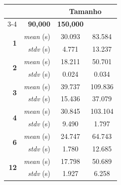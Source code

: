 \begin{tabular}{rr|cc}
\toprule
\multicolumn{2}{r|}{} & \multicolumn{2}{c}{\textbf{Tamanho}} \\
\cmidrule(lr){3-4}
\multicolumn{2}{c|}{\textbf{Threads}} & \textbf{90,000} & \textbf{150,000} \\
\midrule
\multirow{2}{*}{\textbf{1}}
& \textit{mean} (s) & 30.093 & 83.584 \\
& \textit{stdv} (s) & 4.771 & 13.237 \\
\midrule
\multirow{2}{*}{\textbf{2}}
& \textit{mean} (s) & 18.211 & 50.701 \\
& \textit{stdv} (s) & 0.024 & 0.034 \\
\midrule
\multirow{2}{*}{\textbf{3}}
& \textit{mean} (s) & 39.737 & 109.836 \\
& \textit{stdv} (s) & 15.436 & 37.079 \\
\midrule
\multirow{2}{*}{\textbf{4}}
& \textit{mean} (s) & 30.845 & 103.104 \\
& \textit{stdv} (s) & 9.490 & 1.797 \\
\midrule
\multirow{2}{*}{\textbf{6}}
& \textit{mean} (s) & 24.747 & 64.743 \\
& \textit{stdv} (s) & 1.780 & 12.685 \\
\midrule
\multirow{2}{*}{\textbf{12}}
& \textit{mean} (s) & 17.798 & 50.689 \\
& \textit{stdv} (s) & 1.927 & 6.258 \\
\bottomrule
\end{tabular}